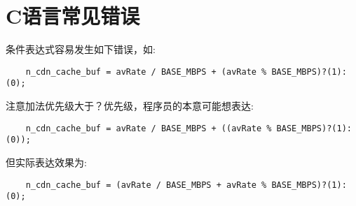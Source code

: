 \section{C语言常见错误}

条件表达式容易发生如下错误，如:
\begin{verbatim}
    n_cdn_cache_buf = avRate / BASE_MBPS + (avRate % BASE_MBPS)?(1):(0);
\end{verbatim}
注意加法优先级大于？优先级，程序员的本意可能想表达:
\begin{verbatim}
    n_cdn_cache_buf = avRate / BASE_MBPS + ((avRate % BASE_MBPS)?(1):(0));
\end{verbatim}
但实际表达效果为:

\begin{verbatim}
    n_cdn_cache_buf = (avRate / BASE_MBPS + avRate % BASE_MBPS)?(1):(0);
\end{verbatim}


